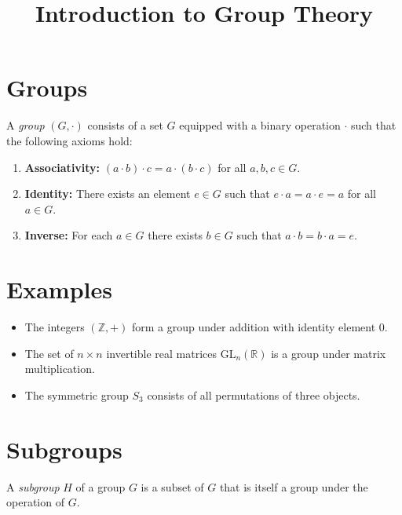 \documentclass{article}
\title{Introduction to Group Theory}
\author{}
\date{}
\begin{document}
\maketitle

\section{Groups}
A \emph{group} $(G,\cdot)$ consists of a set $G$ equipped with a binary operation $\cdot$ such that the following axioms hold:
\begin{enumerate}
  \item \textbf{Associativity:} $(a\cdot b)\cdot c = a\cdot(b\cdot c)$ for all $a,b,c\in G$.
  \item \textbf{Identity:} There exists an element $e\in G$ such that $e\cdot a = a\cdot e = a$ for all $a\in G$.
  \item \textbf{Inverse:} For each $a\in G$ there exists $b\in G$ such that $a\cdot b = b\cdot a = e$.
\end{enumerate}

\section{Examples}
\begin{itemize}
  \item The integers $(\mathbb{Z}, +)$ form a group under addition with identity element $0$.
  \item The set of $n\times n$ invertible real matrices $\mathrm{GL}_n(\mathbb{R})$ is a group under matrix multiplication.
  \item The symmetric group $S_3$ consists of all permutations of three objects.
\end{itemize}

\section{Subgroups}
A \emph{subgroup} $H$ of a group $G$ is a subset of $G$ that is itself a group under the operation of $G$.
\end{document}
